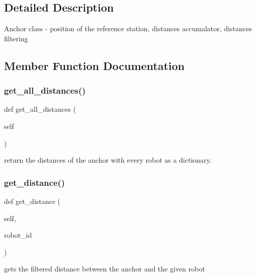 \subsection{Detailed Description}
\begin{DoxyVerb}Anchor class - position of the reference station, distances accumalator, distances filtering\end{DoxyVerb}
 

\subsection{Member Function Documentation}
\mbox{\label{classanchor_1_1_anchor_a8497086c897585b6ee2234e8728e69e5}} 
\subsubsection{\texorpdfstring{get\+\_\+all\+\_\+distances()}{get\_all\_distances()}}
{\footnotesize\ttfamily def get\+\_\+all\+\_\+distances (\begin{DoxyParamCaption}\item[{}]{self }\end{DoxyParamCaption})}

\begin{DoxyVerb}return the distances of the anchor with every robot as a dictionary.\end{DoxyVerb}
 \mbox{\label{classanchor_1_1_anchor_ad92ac937236e0dcb544cf7913f436ab0}} 
\subsubsection{\texorpdfstring{get\+\_\+distance()}{get\_distance()}}
{\footnotesize\ttfamily def get\+\_\+distance (\begin{DoxyParamCaption}\item[{}]{self,  }\item[{}]{robot\+\_\+id }\end{DoxyParamCaption})}

\begin{DoxyVerb}gets the filtered distance between the anchor and the given robot\end{DoxyVerb}
 \mbox{\label{classanchor_1_1_anchor_a09f3f97175c16ea6025da871f653d416}} 
